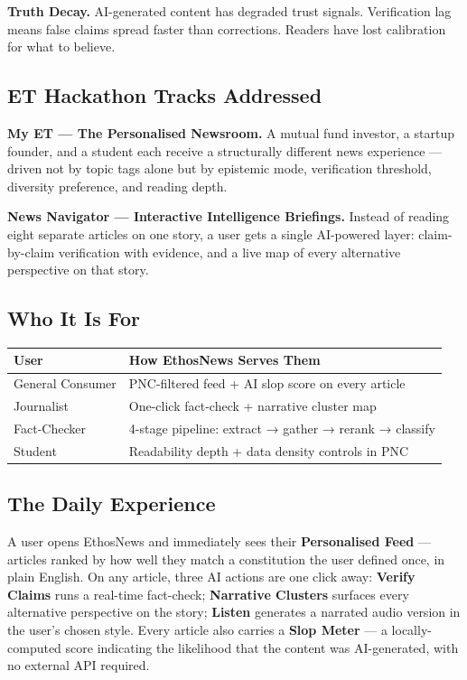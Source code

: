 \documentclass[9pt,a4paper,twocolumn]{article}
\begin{document}
\textbf{Truth Decay.} AI-generated content has degraded trust signals. Verification lag means false claims spread faster than corrections. Readers have lost calibration for what to believe.

\subsection{ET Hackathon Tracks Addressed}

\textbf{My ET — The Personalised Newsroom.} A mutual fund investor, a startup founder, and a student each receive a structurally different news experience — driven not by topic tags alone but by epistemic mode, verification threshold, diversity preference, and reading depth.

\textbf{News Navigator — Interactive Intelligence Briefings.} Instead of reading eight separate articles on one story, a user gets a single AI-powered layer: claim-by-claim verification with evidence, and a live map of every alternative perspective on that story.

\subsection{Who It Is For}

\begin{center}
\small
\begin{tabularx}{\columnwidth}{@{}lX@{}}
\toprule
\textbf{User} & \textbf{How EthosNews Serves Them} \\
\midrule
General Consumer & PNC-filtered feed + AI slop score on every article \\
Journalist & One-click fact-check + narrative cluster map \\
Fact-Checker & 4-stage pipeline: extract → gather → rerank → classify \\
Student & Readability depth + data density controls in PNC \\
\bottomrule
\end{tabularx}
\end{center}

\subsection{The Daily Experience}

A user opens EthosNews and immediately sees their \textbf{Personalised Feed} — articles ranked by how well they match a constitution the user defined once, in plain English. On any article, three AI actions are one click away: \textbf{Verify Claims} runs a real-time fact-check; \textbf{Narrative Clusters} surfaces every alternative perspective on the story; \textbf{Listen} generates a narrated audio version in the user's chosen style. Every article also carries a \textbf{Slop Meter} — a locally-computed score indicating the likelihood that the content was AI-generated, with no external API required.
\end{document}
